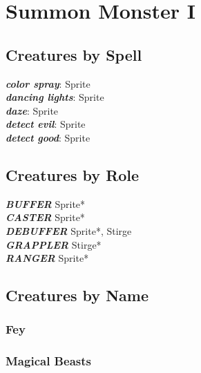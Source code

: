 \newpage

\def \levelnnumsummons{1}

\chapter{Summon Monster I}
\newpage

\section{Creatures by Spell}

\vspace{10pt}

\textbf{\textit{color spray}}: Sprite \\
\textbf{\textit{dancing lights}}: Sprite \\
\textbf{\textit{daze}}: Sprite \\
\textbf{\textit{detect evil}}: Sprite \\
\textbf{\textit{detect good}}: Sprite \\

\newpage

\section{Creatures by Role}

\vspace{5pt}

\textbf{\textit{BUFFER}} Sprite* \\

\textbf{\textit{CASTER}} Sprite* \\

\textbf{\textit{DEBUFFER}} Sprite*, Stirge \\

\textbf{\textit{GRAPPLER}} Stirge* \\

\textbf{\textit{RANGER}} Sprite* \\

\newpage

\section{Creatures by Name} 

\subsection{Fey}

\subsection{Magical Beasts}

